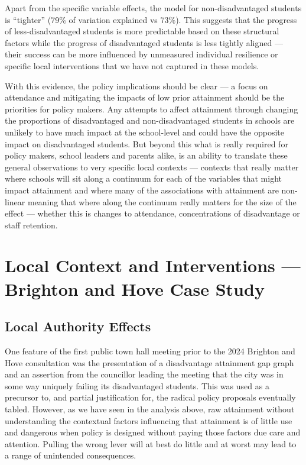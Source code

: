 \documentclass[
  11pt,
]{article}
\begin{document}
Apart from the specific variable effects, the model for
non-disadvantaged students is ``tighter'' (79\% of variation explained
vs 73\%). This suggests that the progress of less-disadvantaged students
is more predictable based on these structural factors while the progress
of disadvantaged students is less tightly aligned --- their success can
be more influenced by unmeasured individual resilience or specific local
interventions that we have not captured in these models.

With this evidence, the policy implications should be clear --- a focus
on attendance and mitigating the impacts of low prior attainment should
be the priorities for policy makers. Any attempts to affect attainment
through changing the proportions of disadvantaged and non-disadvantaged
students in schools are unlikely to have much impact at the school-level
and could have the opposite impact on disadvantaged students. But beyond
this what is really required for policy makers, school leaders and
parents alike, is an ability to translate these general observations to
very specific local contexts --- contexts that really matter where
schools will sit along a continuum for each of the variables that might
impact attainment and where many of the associations with attainment are
non-linear meaning that where along the continuum really matters for the
size of the effect --- whether this is changes to attendance,
concentrations of disadvantage or staff retention.

\section{Local Context and Interventions --- Brighton and Hove Case
Study}\label{local-context-and-interventions-brighton-and-hove-case-study}

\subsection{Local Authority Effects}\label{local-authority-effects}

One feature of the first public town hall meeting prior to the 2024
Brighton and Hove consultation was the presentation of a disadvantage
attainment gap graph and an assertion from the councillor leading the
meeting that the city was in some way uniquely failing its disadvantaged
students. This was used as a precursor to, and partial justification
for, the radical policy proposals eventually tabled. However, as we have
seen in the analysis above, raw attainment without understanding the
contextual factors influencing that attainment is of little use and
dangerous when policy is designed without paying those factors due care
and attention. Pulling the wrong lever will at best do little and at
worst may lead to a range of unintended consequences.
\end{document}
